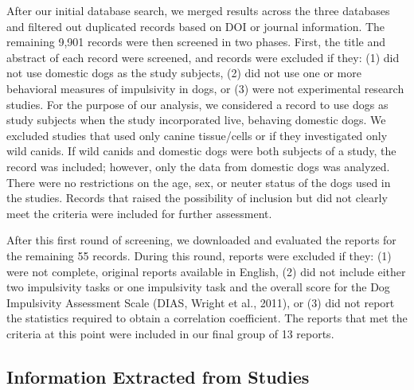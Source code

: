 \documentclass[
  ,pub,floatsintext]{apa6}
\begin{document}
After our initial database search, we merged results across the three databases and filtered out duplicated records based on DOI or journal information. The remaining 9,901 records were then screened in two phases. First, the title and abstract of each record were screened, and records were excluded if they: (1) did not use domestic dogs as the study subjects, (2) did not use one or more behavioral measures of impulsivity in dogs, or (3) were not experimental research studies. For the purpose of our analysis, we considered a record to use dogs as study subjects when the study incorporated live, behaving domestic dogs. We excluded studies that used only canine tissue/cells or if they investigated only wild canids. If wild canids and domestic dogs were both subjects of a study, the record was included; however, only the data from domestic dogs was analyzed. There were no restrictions on the age, sex, or neuter status of the dogs used in the studies. Records that raised the possibility of inclusion but did not clearly meet the criteria were included for further assessment.

After this first round of screening, we downloaded and evaluated the reports for the remaining 55 records. During this round, reports were excluded if they: (1) were not complete, original reports available in English, (2) did not include either two impulsivity tasks or one impulsivity task and the overall score for the Dog Impulsivity Assessment Scale (DIAS, Wright et al., 2011), or (3) did not report the statistics required to obtain a correlation coefficient. The reports that met the criteria at this point were included in our final group of 13 reports.

\hypertarget{information-extracted-from-studies}{%
\subsection{Information Extracted from Studies}\label{information-extracted-from-studies}}
\end{document}
